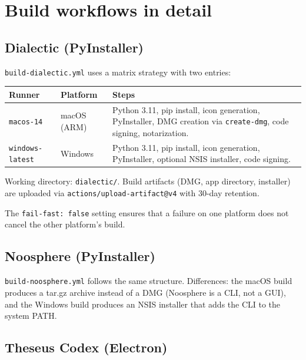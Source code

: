 \documentclass[11pt,letterpaper]{article}
\newcommand{\file}[1]{\texttt{#1}}
\newcommand{\cmd}[1]{\texttt{#1}}
\begin{document}
\section{Build workflows in detail}

\subsection{Dialectic (PyInstaller)}

\file{build-dialectic.yml} uses a matrix strategy with two entries:

\begin{table}[h]
\small
\begin{tabular}{p{3cm} p{3cm} p{8.5cm}}
\toprule
\textbf{Runner} & \textbf{Platform} & \textbf{Steps} \\
\midrule
\cmd{macos-14} & macOS (ARM) & Python 3.11, pip install, icon generation, PyInstaller, DMG creation via \cmd{create-dmg}, code signing, notarization. \\
\cmd{windows-latest} & Windows & Python 3.11, pip install, icon generation, PyInstaller, optional NSIS installer, code signing. \\
\bottomrule
\end{tabular}
\end{table}

Working directory: \file{dialectic/}. Build artifacts (DMG, app directory, installer) are uploaded via \cmd{actions/upload-artifact@v4} with 30-day retention.

The \cmd{fail-fast: false} setting ensures that a failure on one platform does not cancel the other platform's build.

\subsection{Noosphere (PyInstaller)}

\file{build-noosphere.yml} follows the same structure. Differences: the macOS build produces a tar.gz archive instead of a DMG (Noosphere is a CLI, not a GUI), and the Windows build produces an NSIS installer that adds the CLI to the system PATH.

\subsection{Theseus Codex (Electron)}
\end{document}
